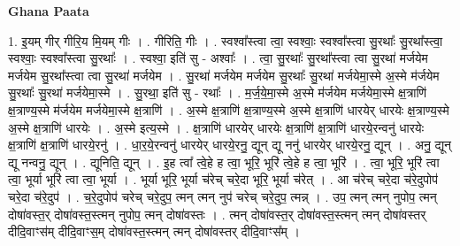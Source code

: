 \documentclass[17pt]{extarticle}
\begin{document}
\textbf{Ghana Paata } \newline

1. इ॒यम् गीर् गीरि॒य मि॒यम् गीः । . गीरिति॒ गीः । . स्वश्वा᳚स्त्वा त्वा॒ स्वश्वाः॒ स्वश्वा᳚स्त्वा सु॒रथाः᳚ सु॒रथा᳚स्त्वा॒ स्वश्वाः॒ स्वश्वा᳚स्त्वा सु॒रथाः᳚ । . स्वश्वा॒ इति॑ सु - अश्वाः᳚ । . त्वा॒ सु॒रथाः᳚ सु॒रथा᳚स्त्वा त्वा सु॒रथा॑ मर्जयेम मर्जयेम सु॒रथा᳚स्त्वा त्वा सु॒रथा॑ मर्जयेम । . सु॒रथा॑ मर्जयेम मर्जयेम सु॒रथाः᳚ सु॒रथा॑ मर्जयेमा॒स्मे अ॒स्मे म॑र्जयेम सु॒रथाः᳚ सु॒रथा॑ मर्जयेमा॒स्मे । . सु॒रथा॒ इति॑ सु - रथाः᳚ । . म॒र्ज॒ये॒मा॒स्मे अ॒स्मे म॑र्जयेम मर्जयेमा॒स्मे क्ष॒त्राणि॑ क्ष॒त्राण्य॒स्मे म॑र्जयेम मर्जयेमा॒स्मे क्ष॒त्राणि॑ । . अ॒स्मे क्ष॒त्राणि॑ क्ष॒त्राण्य॒स्मे अ॒स्मे क्ष॒त्राणि॑ धारयेर् धारयेः क्ष॒त्राण्य॒स्मे अ॒स्मे क्ष॒त्राणि॑ धारयेः । . अ॒स्मे इत्य॒स्मे । . क्ष॒त्राणि॑ धारयेर् धारयेः क्ष॒त्राणि॑ क्ष॒त्राणि॑ धारये॒रन्वनु॑ धारयेः क्ष॒त्राणि॑ क्ष॒त्राणि॑ धारये॒रनु॑ । . धा॒र॒ये॒रन्वनु॑ धारयेर् धारये॒रनु॒ द्यून् द्यू ननु॑ धारयेर् धारये॒रनु॒ द्यून् । . अनु॒ द्यून् द्यू नन्वनु॒ द्यून् । . द्यूनिति॒ द्यून् । . इ॒ह त्वा᳚ त्वे॒हे ह त्वा॒ भूरि॒ भूरि॑ त्वे॒हे ह त्वा॒ भूरि॑ । . त्वा॒ भूरि॒ भूरि॑ त्वा त्वा॒ भूर्या भूरि॑ त्वा त्वा॒ भूर्या । . भूर्या भूरि॒ भूर्या च॑रेच् चरे॒दा भूरि॒ भूर्या च॑रेत् । . आ च॑रेच् चरे॒दा च॑रे॒दुपोप॑ चरे॒दा च॑रे॒दुप॑ । . च॒रे॒दुपोप॑ चरेच् चरे॒दुप॒ त्मन् त्मन् नुप॑ चरेच् चरे॒दुप॒ त्मन्न् । . उप॒ त्मन् त्मन् नुपोप॒ त्मन् दोषा॑वस्त॒र् दोषा॑वस्त॒स्त्मन् नुपोप॒ त्मन् दोषा॑वस्तः । . त्मन् दोषा॑वस्त॒र् दोषा॑वस्त॒स्त्मन् त्मन् दोषा॑वस्तर् दीदि॒वाꣳस॑म् दीदि॒वाꣳस॒म् दोषा॑वस्त॒स्त्मन् त्मन् दोषा॑वस्तर् दीदि॒वाꣳस᳚म् । \newline
\end{document}
